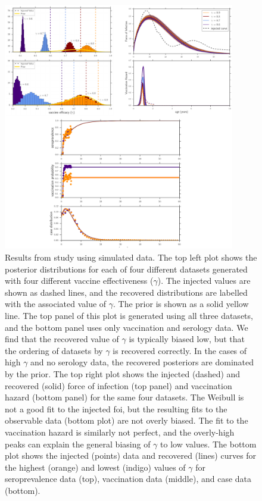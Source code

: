 \documentclass[nofootinbib,aps,pre,twocolumn,superscriptaddress,showkeys,showpacs]{revtex4-1}
\begin{document}
\begin{figure}
\includegraphics[width=0.9\textwidth,angle=0]{figures/SimPlots-crop.pdf}
\caption{\label{fig:simplots} Results from study using simulated data. 
The top left plot shows the posterior distributions for each of four different datasets generated with four different vaccine effectiveness ($\gamma$). The injected values are shown as dashed lines, and the recovered distributions are labelled with the associated value of $\gamma$. The prior is shown as a solid yellow line. The top panel of this plot is generated using all three datasets, and the bottom panel uses only vaccination and serology data. We find that the recovered value of $\gamma$ is typically biased low, but that the ordering of datasets by $\gamma$ is recovered correctly. In the cases of high $\gamma$ and no serology data, the recovered posteriors are dominated by the prior.
The top right plot shows the injected (dashed) and recovered (solid) force of infection (top panel) and vaccination hazard (bottom panel) for the same four datasets. The Weibull is not a good fit to the injected foi, but the resulting fits to the observable data (bottom plot) are not overly biased. The fit to the vaccination hazard is similarly not perfect, and the overly-high peaks can explain the general biasing of $\gamma$ to low values. 
The bottom plot shows the injected (points) data and recovered (lines) curves for the highest (orange) and lowest (indigo) values of $\gamma$ for seroprevalence data (top), vaccination data (middle), and case data (bottom).}
\end{figure}
\end{document}

